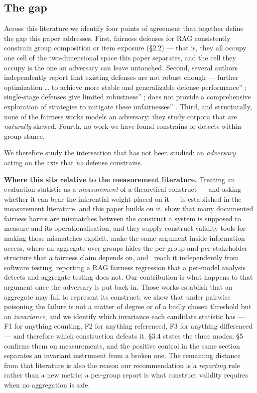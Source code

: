 \documentclass[authoryear,review,3p,times]{elsarticle}
\newcounter{none}
\begin{document}
\subsection{The gap}\label{the-gap}

Across this literature we identify four points of agreement that together define the gap this paper addresses. First, fairness defenses for RAG consistently constrain group composition or item exposure (§2.2) --- that is, they all occupy one cell of the two-dimensional space this paper separates, and the cell they occupy is the one an adversary can leave untouched. Second, several authors independently report that existing defenses are not robust enough --- \texttt{}further optimization \ldots{} to achieve more stable and generalizable defense performance'' \citeyearpar{wang2025}; \texttt{}single-stage defenses give limited robustness'' \citeyearpar{mohanty2026}; \texttt{}does not provide a comprehensive exploration of strategies to mitigate these unfairnesses'' \citeyearpar{wu2025}. Third, and structurally, none of the fairness works models an adversary: they study corpora that are \emph{naturally} skewed. Fourth, no work we have found constrains or detects within-group stance.

We therefore study the intersection that has not been studied: an \emph{adversary} acting on the axis that \emph{no} defense constrains.

\textbf{Where this sits relative to the measurement literature.} Treating an evaluation statistic as a \emph{measurement} of a theoretical construct --- and asking whether it can bear the inferential weight placed on it --- is established in the measurement literature, and this paper builds on it. \citet{jacobs2021} show that many documented fairness harms are mismatches between the construct a system is supposed to measure and its operationalisation, and they supply construct-validity tools for making those mismatches explicit. \citet{ekstrand2022a} make the same argument inside information access, where an aggregate over groups hides the per-group and per-stakeholder structure that a fairness claim depends on, and~\citet{oliveira2026} reach it independently from software testing, reporting a RAG fairness regression that a per-model analysis detects and aggregate testing does not. Our contribution is what happens to that argument once the adversary is put back in. Those works establish that an aggregate may fail to represent its construct; we show that under pairwise poisoning the failure is not a matter of degree or of a badly chosen threshold but an \emph{invariance}, and we identify which invariance each candidate statistic has --- F1 for anything counting, F2 for anything referenced, F3 for anything differenced --- and therefore which construction defeats it. §3.4 states the three modes, §5 confirms them on measurements, and the positive control in the same section separates an invariant instrument from a broken one. The remaining distance from that literature is also the reason our recommendation is a \emph{reporting} rule rather than a new metric: a per-group report is what construct validity requires when no aggregation is safe.
\end{document}
